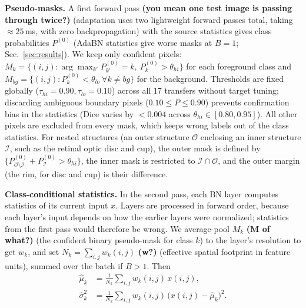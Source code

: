 \documentclass{article}
\begin{document}
\textbf{Pseudo-masks.} A first forward pass \textbf{(you mean one test image is passing through twice?)} (adaptation uses two lightweight forward passes total, taking $\approx 25$\,ms, with zero backpropagation) with the source statistics gives class probabilities $P^{(0)}$ (AdaBN statistics give worse masks at $B{=}1$; Sec.~\ref{sec:results}). We keep only confident pixels: $M_k=\{(i,j):\arg\max_{k'}P^{(0)}_{k'}=k,\ P^{(0)}_k>\theta_{hi}\}$ for each foreground class and $M_{bg}=\{(i,j):P^{(0)}_k<\theta_{lo}\ \forall k\neq bg\}$ for the background. Thresholds are fixed globally ($\tau_{hi}{=}0.90, \tau_{lo}{=}0.10$) across all 17 transfers without target tuning; discarding ambiguous boundary pixels ($0.10 \le P \le 0.90$) prevents confirmation bias in the statistics (Dice varies by $<0.004$ across $\theta_{hi} \in [0.80, 0.95]$). All other pixels are excluded from every mask, which keeps wrong labels out of the class statistics. For nested structures (an outer structure $\mathcal{O}$ enclosing an inner structure $\mathcal{I}$, such as the retinal optic disc and cup), the outer mask is defined by $\{P^{(0)}_{\mathcal{O}\setminus\mathcal{I}} + P^{(0)}_{\mathcal{I}} > \theta_{hi}\}$, the inner mask is restricted to $\mathcal{I} \cap \mathcal{O}$, and the outer margin (the rim, for disc and cup) is their difference.

\textbf{Class-conditional statistics.} In the second pass, each BN layer computes statistics of its current input $x$. Layers are processed in forward order, because each layer's input depends on how the earlier layers were normalized; statistics from the first pass would therefore be wrong. We average-pool $M_k$ \textbf{(M of what?)} (the confident binary pseudo-mask for class $k$) to the layer's resolution to get $w_k$, and set $N_k=\sum_{i,j}w_k(i,j)$ \textbf{(w?)} (effective spatial footprint in feature units), summed over the batch if $B>1$. Then
\begin{equation}
\begin{aligned}
\hat\mu_k&=\tfrac{1}{N_k}\textstyle\sum_{i,j}w_k(i,j)\,x(i,j),\\
\hat\sigma^2_k&=\tfrac{1}{N_k}\textstyle\sum_{i,j}w_k(i,j)\,\bigl(x(i,j)-\hat\mu_k\bigr)^2 .
\end{aligned}
\label{eq:stats}
\end{equation}
\end{document}
